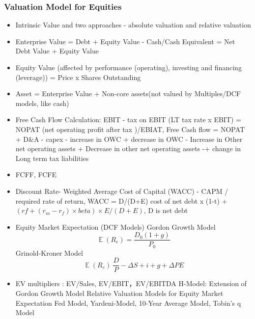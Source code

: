 \documentclass[11pt, openany]{book}              %
\DeclareMathOperator{\E}{\mathbb{E}}
\begin{document}
\subsubsection{Valuation Model for Equities} 

\begin{itemize}
	\item Intrinsic Value and two approaches - absolute valuation and relative valuation 
	\item Enterprise Value = Debt + Equity Value - Cash/Cash Equivalent = Net Debt Value + Equity Value
	\item Equity Value (affected by performance (operating), investing and financing (leverage)) = Price x Shares Outstanding
	\item Asset = Enterprise Value + Non-core assets(not valued by Multiples/DCF models, like cash)
	\item Free Cash Flow Calculation: EBIT - tax on EBIT (LT tax rate x EBIT) = NOPAT (net operating profit after tax )/EBIAT, Free Cash flow = NOPAT + D\&A - capex - increase in OWC + decrease in OWC - Increase in Other net operating assets + Decrease in other net operating assets -+ change in Long term tax liabilities
	\item FCFF, FCFE 
	\item Discount Rate- Weighted Average Cost of Capital (WACC) - CAPM / required rate of return, WACC = D/(D+E) cost of net debt x (1-t) + $(rf+(r_m-r_f)\times beta)\times E/(D+E)$, D is net debt
	\item Equity Market Expectation (DCF Models)
	\subitem Gordon Growth Model
	$$ \E(R_e) = \frac{D_0(1+g)}{P_0}$$
	\subitem Grinold-Kroner Model
	$$ \E(R_e) \ \frac{D}{P} - \Delta S + i + g + \Delta PE$$
	\item EV multipliers : EV/Sales, EV/EBIT，EV/EBITDA
	\subitem H-Model: Extension of Gordon Growth Model
	\subitem Relative Valuation Models for Equity Market Expectation
		\subitem Fed Model, Yardeni-Model, 10-Year Average Model, Tobin's q Model
\end{itemize}
\end{document}
